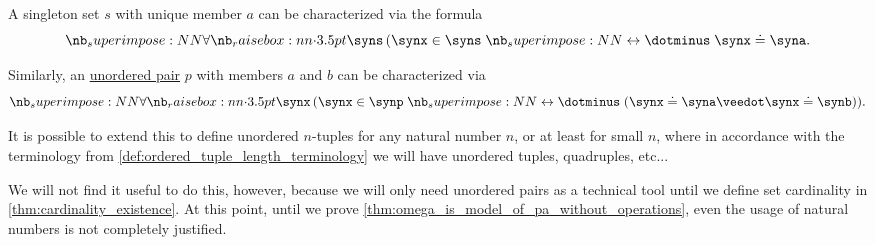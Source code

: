\begin{remark}\label{rem:unordered_tuples}
  A singleton set \( s \) with unique member \( a \) can be characterized via the formula
  \begin{equation*}
    \qforall \syns (\synx \in \syns \syniff \synx \syneq \syna.
  \end{equation*}

  Similarly, an \hyperref[def:unordered_pair]{unordered pair} \( p \) with members \( a \) and \( b \) can be characterized via
  \begin{equation*}
    \qforall \synx (\synx \in \synp \syniff (\synx \syneq \syna \synvee \synx \syneq \synb)).
  \end{equation*}

  It is possible to extend this to define unordered \( n \)-tuples for any natural number \( n \), or at least for small \( n \), where in accordance with the terminology from \cref{def:ordered_tuple_length_terminology} we will have unordered tuples, quadruples, etc...

  We will not find it useful to do this, however, because we will only need unordered pairs as a technical tool until we define set cardinality in \cref{thm:cardinality_existence}. At this point, until we prove \cref{thm:omega_is_model_of_pa_without_operations}, even the usage of natural numbers is not completely justified.
\end{remark}

